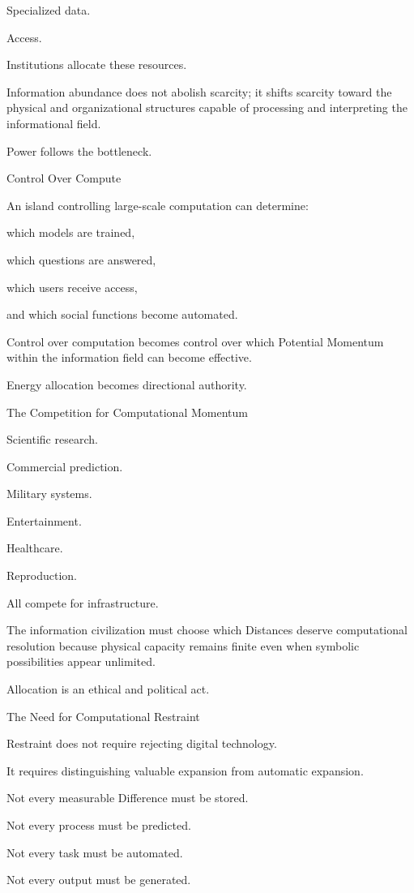 Specialized data.

Access.

Institutions allocate these resources.

Information abundance does not abolish scarcity; it shifts scarcity toward the physical and organizational structures capable of processing and interpreting the informational field.

Power follows the bottleneck.

Control Over Compute

An island controlling large-scale computation can determine:

which models are trained,

which questions are answered,

which users receive access,

and which social functions become automated.

Control over computation becomes control over which Potential Momentum within the information field can become effective.

Energy allocation becomes directional authority.

The Competition for Computational Momentum

Scientific research.

Commercial prediction.

Military systems.

Entertainment.

Healthcare.

Reproduction.

All compete for infrastructure.

The information civilization must choose which Distances deserve computational resolution because physical capacity remains finite even when symbolic possibilities appear unlimited.

Allocation is an ethical and political act.

The Need for Computational Restraint

Restraint does not require rejecting digital technology.

It requires distinguishing valuable expansion from automatic expansion.

Not every measurable Difference must be stored.

Not every process must be predicted.

Not every task must be automated.

Not every output must be generated.

